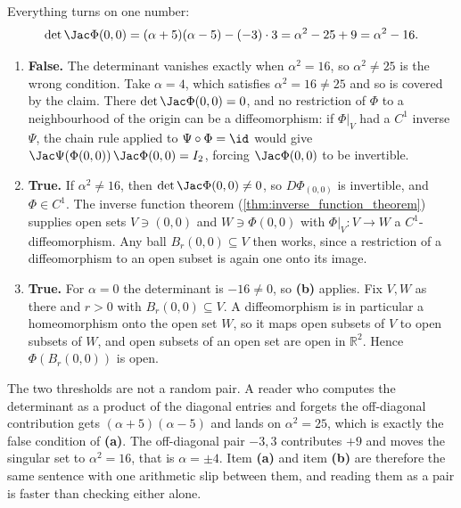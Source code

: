 \begin{exercisesolution}
\label{sol:local_diffeo_parameter_alpha}
Everything turns on one number:
\[\det\Jac\Phi(0,0) = (\alpha+5)(\alpha-5) - (-3)\cdot 3 = \alpha^2 - 25 + 9 = \alpha^2 - 16 .\]
\begin{enumerate}[label=\textbf{(\alph*)}]
  \item \textbf{False.} The determinant vanishes exactly when $\alpha^2 = 16$, so $\alpha^2 \neq 25$
    is the wrong condition. Take $\alpha = 4$, which satisfies $\alpha^2 = 16 \neq 25$ and so is
    covered by the claim. There $\det\Jac\Phi(0,0) = 0$, and no restriction of $\Phi$ to a
    neighbourhood of the origin can be a diffeomorphism: if $\Phi|_V$ had a $C^1$ inverse $\Psi$,
    the chain rule applied to $\Psi\circ\Phi = \id$ would give
    $\Jac\Psi(\Phi(0,0))\,\Jac\Phi(0,0) = I_2$, forcing $\Jac\Phi(0,0)$ to be invertible.
  \item \textbf{True.} If $\alpha^2 \neq 16$, then $\det\Jac\Phi(0,0) \neq 0$, so
    $D\Phi_{(0,0)}$ is invertible, and $\Phi \in C^1$. The inverse function theorem
    (\cref{thm:inverse_function_theorem}) supplies open sets $V \ni (0,0)$ and $W \ni \Phi(0,0)$
    with $\Phi|_V : V \to W$ a $C^1$-diffeomorphism. Any ball $B_r(0,0) \subseteq V$ then works,
    since a restriction of a diffeomorphism to an open subset is again one onto its image.
  \item \textbf{True.} For $\alpha = 0$ the determinant is $-16 \neq 0$, so \textbf{(b)} applies.
    Fix $V, W$ as there and $r > 0$ with $B_r(0,0) \subseteq V$. A diffeomorphism is in particular
    a homeomorphism onto the open set $W$, so it maps open subsets of $V$ to open subsets of $W$,
    and open subsets of an open set are open in $\mathbb{R}^2$. Hence $\Phi(B_r(0,0))$ is open.
\end{enumerate}
\begin{remark}
The two thresholds are not a random pair. A reader who computes the determinant as a product of
the diagonal entries and forgets the off-diagonal contribution gets $(\alpha+5)(\alpha-5)$ and
lands on $\alpha^2 = 25$, which is exactly the false condition of \textbf{(a)}. The off-diagonal
pair $-3, 3$ contributes $+9$ and moves the singular set to $\alpha^2 = 16$, that is
$\alpha = \pm4$. Item \textbf{(a)} and item \textbf{(b)} are therefore the same sentence with one
arithmetic slip between them, and reading them as a pair is faster than checking either alone.
\end{remark}
\end{exercisesolution}

